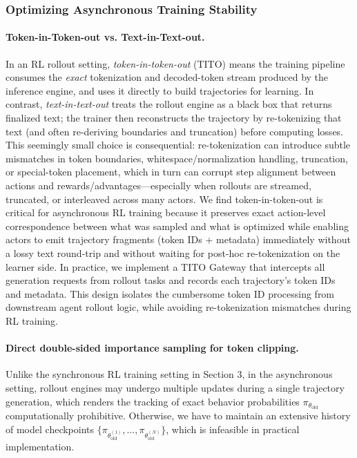 \subsubsection{Optimizing Asynchronous Training Stability}
\paragraph{Token-in-Token-out vs. Text-in-Text-out.}
In an RL rollout setting, \emph{token-in-token-out} (TITO) means the training pipeline consumes the \emph{exact} tokenization and decoded-token stream produced by the inference engine, and uses it directly to build trajectories for learning. 
In contrast, \emph{text-in-text-out} treats the rollout engine as a black box that returns finalized text; the trainer then reconstructs the trajectory by re-tokenizing that text (and often re-deriving boundaries and truncation) before computing losses. 
This seemingly small choice is consequential: re-tokenization can introduce subtle mismatches in token boundaries, whitespace/normalization handling, truncation, or special-token placement, which in turn can corrupt step alignment between actions and rewards/advantages—especially when rollouts are streamed, truncated, or interleaved across many actors. 
We find token-in-token-out is critical for asynchronous RL training because it preserves exact action-level correspondence between what was sampled and what is optimized while enabling actors to emit trajectory fragments (token IDs + metadata) immediately without a lossy text round-trip and without waiting for post-hoc re-tokenization on the learner side.
In practice, we implement a TITO Gateway that intercepts all generation requests from rollout tasks and records each trajectory’s token IDs and metadata. 
This design isolates the cumbersome token ID processing from downstream agent rollout logic, while avoiding re-tokenization mismatches during RL training.


\paragraph{Direct
double-sided importance sampling for token clipping.}
Unlike the synchronous RL training setting in Section 3, in the asynchronous setting, rollout engines may undergo multiple updates during a single trajectory generation,
which renders the tracking of exact behavior probabilities $\pi_{\theta_{\text{old}}}$ computationally prohibitive. Otherwise, we have to maintain an extensive history of model checkpoints $\{\pi_{\theta_{\text{old}}^{(1)}}, \dots, \pi_{\theta_{\text{old}}^{(N)}}\}$, which is infeasible in practical implementation.

